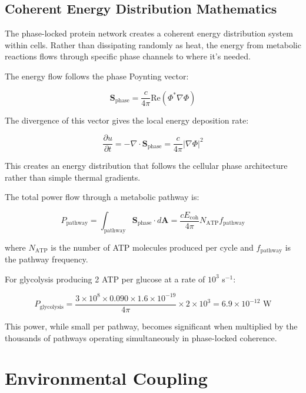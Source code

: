 \documentclass[12pt,a4paper]{report}
\begin{document}
\subsection{Coherent Energy Distribution Mathematics}

The phase-locked protein network creates a coherent energy distribution system within cells. Rather than dissipating randomly as heat, the energy from metabolic reactions flows through specific phase channels to where it's needed.

The energy flow follows the phase Poynting vector:

\begin{equation}
\mathbf{S}_{\text{phase}} = \frac{c}{4\pi} \text{Re}(\Phi^* \nabla\Phi)
\end{equation}

The divergence of this vector gives the local energy deposition rate:

\begin{equation}
\frac{\partial u}{\partial t} = -\nabla \cdot \mathbf{S}_{\text{phase}} = \frac{c}{4\pi} |\nabla\Phi|^2
\end{equation}

This creates an energy distribution that follows the cellular phase architecture rather than simple thermal gradients.

The total power flow through a metabolic pathway is:

\begin{equation}
P_{\text{pathway}} = \int_{\text{pathway}} \mathbf{S}_{\text{phase}} \cdot d\mathbf{A} = \frac{c E_{\text{coh}}}{4\pi} N_{\text{ATP}} f_{\text{pathway}}
\end{equation}

where $N_{\text{ATP}}$ is the number of ATP molecules produced per cycle and $f_{\text{pathway}}$ is the pathway frequency.

For glycolysis producing 2 ATP per glucose at a rate of $10^3$ s$^{-1}$:

\begin{equation}
P_{\text{glycolysis}} = \frac{3 \times 10^8 \times 0.090 \times 1.6 \times 10^{-19}}{4\pi} \times 2 \times 10^3 = 6.9 \times 10^{-12} \text{ W}
\end{equation}

This power, while small per pathway, becomes significant when multiplied by the thousands of pathways operating simultaneously in phase-locked coherence.

\section{Environmental Coupling}
\end{document}
